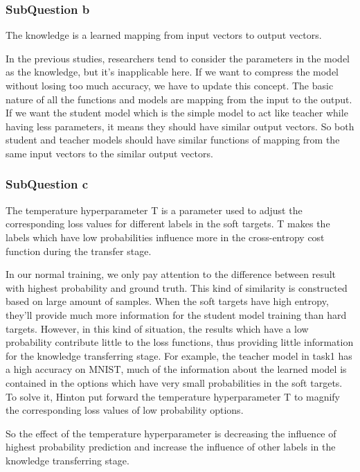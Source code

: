 \documentclass[conference]{IEEEtran}
\begin{document}
\subsubsection{SubQuestion b}
The knowledge is a learned mapping from input vectors to output vectors.\par
In the previous studies, researchers tend to consider the parameters in the model as the knowledge, but it's inapplicable here. If we want to compress the model without losing too much accuracy, we have to update this concept. 
The basic nature of all the functions and models are mapping from the input to the output. 
If we want the student model which is the simple model to act like teacher while having less parameters, it means they should have similar output vectors. So both student and teacher models should have similar functions of mapping from the same input vectors to the similar output vectors.
\subsubsection{SubQuestion c}
The temperature hyperparameter T is a parameter used to adjust the corresponding loss values for different labels in the soft targets. T makes the labels which have low probabilities influence more in the cross-entropy cost function during the transfer stage.\par
In our normal training, we only pay attention to the difference between result with highest probability and ground truth. This kind of similarity is constructed based on large amount of samples.
When the soft targets have high entropy, they'll provide much more information for the student model training than hard targets. However, in this kind of situation, the results which have a low probability contribute little to the loss functions, thus providing little information for the knowledge transferring stage.
For example, the teacher model in task1 has a high accuracy on MNIST, much of the information about the learned model is contained in the options which have very small probabilities in the soft targets. To solve it, Hinton\cite{b6} put forward the temperature hyperparameter T to magnify the corresponding loss values of low probability options.
\par
So the effect of the temperature hyperparameter is decreasing the influence of highest probability prediction and increase the influence of other labels in the knowledge transferring stage.
\end{document}
